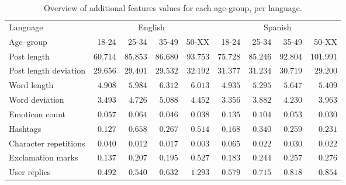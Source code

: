 \documentclass[10pt, a4paper]{article}
\begin{document}
\begin{table*}
\caption{Overview of additional features values for each age-group, per language.}
\label{tab:additionalfeatures-age}
\begin{center}
\begin{tabular}{l|rrrr|rrrr}
\toprule
Language & \multicolumn{4}{|c|}{English} & \multicolumn{4}{|c}{Spanish} \\
Age--group & 18-24 & 25-34 & 35-49 & 50-XX & 18-24 & 25-34 & 35-49 & 50-XX \\
\midrule
Post length & $ 60.714 $ & $ 85.853 $ & $ 86.680 $ & $ 93.753 $ & $ 75.728 $ & $ 85.246 $ & $ 92.804 $ & $ 101.991 $ \\
Post length deviation & $ 29.656 $ & $ 29.401 $ & $ 29.532 $ & $ 32.192 $ & $ 31.377 $ & $ 31.234 $ & $ 30.719 $ & $ 29.200 $ \\
Word length & $ 4.908 $ & $ 5.984 $ & $ 6.312 $ & $ 6.013 $ & $ 4.935 $ & $ 5.295 $ & $ 5.647 $ & $ 5.409 $ \\
Word deviation & $ 3.493 $ & $ 4.726 $ & $ 5.088 $ & $ 4.452 $ & $ 3.356 $ & $ 3.882 $ & $ 4.230 $ & $ 3.963 $ \\
Emoticon count & $ 0.057 $ & $ 0.064 $ & $ 0.046 $ & $ 0.038 $ & $ 0.135 $ & $ 0.104 $ & $ 0.053 $ & $ 0.030 $ \\
Hashtags & $ 0.127 $ & $ 0.658 $ & $ 0.267 $ & $ 0.514 $ & $ 0.168 $ & $ 0.340 $ & $ 0.259 $ & $ 0.231 $ \\
Character repetitions & $ 0.040 $ & $ 0.012 $ & $ 0.017 $ & $ 0.003 $ & $ 0.065 $ & $ 0.022 $ & $ 0.030 $ & $ 0.022 $ \\
Exclamation marks & $ 0.137 $ & $ 0.207 $ & $ 0.195 $ & $ 0.527 $ & $ 0.183 $ & $ 0.244 $ & $ 0.257 $ & $ 0.276 $ \\
User replies & $ 0.492 $ & $ 0.540 $ & $ 0.632 $ & $ 1.293 $ & $ 0.579 $ & $ 0.715 $ & $ 0.818 $ & $ 0.854 $ \\
\bottomrule
\end{tabular}
\end{center}
\end{table*}
\end{document}

